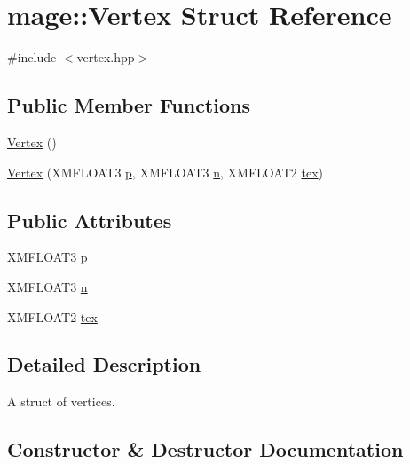 \hypertarget{structmage_1_1_vertex}{}\section{mage\+:\+:Vertex Struct Reference}
\label{structmage_1_1_vertex}


{\ttfamily \#include $<$vertex.\+hpp$>$}

\subsection*{Public Member Functions}
\begin{DoxyCompactItemize}
\item 
\hyperlink{structmage_1_1_vertex_a8bf3578fcb5595eab057dc2d1f916dce}{Vertex} ()
\item 
\hyperlink{structmage_1_1_vertex_a19ef5e9829752aa2134bc25617ce910d}{Vertex} (X\+M\+F\+L\+O\+A\+T3 \hyperlink{structmage_1_1_vertex_a9d726a508934b3baccfb01ea912420e7}{p}, X\+M\+F\+L\+O\+A\+T3 \hyperlink{structmage_1_1_vertex_a0b6c65dd92ba473f490e790189d92daf}{n}, X\+M\+F\+L\+O\+A\+T2 \hyperlink{structmage_1_1_vertex_a85ae82408f02d64ae567a74efe151188}{tex})
\end{DoxyCompactItemize}
\subsection*{Public Attributes}
\begin{DoxyCompactItemize}
\item 
X\+M\+F\+L\+O\+A\+T3 \hyperlink{structmage_1_1_vertex_a9d726a508934b3baccfb01ea912420e7}{p}
\item 
X\+M\+F\+L\+O\+A\+T3 \hyperlink{structmage_1_1_vertex_a0b6c65dd92ba473f490e790189d92daf}{n}
\item 
X\+M\+F\+L\+O\+A\+T2 \hyperlink{structmage_1_1_vertex_a85ae82408f02d64ae567a74efe151188}{tex}
\end{DoxyCompactItemize}


\subsection{Detailed Description}
A struct of vertices. 

\subsection{Constructor \& Destructor Documentation}
\hypertarget{structmage_1_1_vertex_a8bf3578fcb5595eab057dc2d1f916dce}{}\label{structmage_1_1_vertex_a8bf3578fcb5595eab057dc2d1f916dce} 
